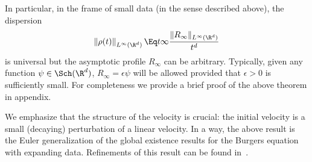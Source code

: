 In particular, in the frame of small data (in the sense described above), the dispersion
\begin{equation*}
\left\| \rho(t)\right\|_{L^\infty(\R^d)}\Eq t \infty \frac{\|R_\infty\|_{L^\infty(\R^d)}}{t^d}
\end{equation*}
is universal but the asymptotic profile $R_\infty$ can be arbitrary. Typically, given any function $\psi\in \Sch(\R^d)$, $R_\infty= \epsilon \psi$ will be allowed provided that $\epsilon>0$ is sufficiently small. For completeness we provide a brief proof of the above theorem in appendix.

We emphasize that the structure of the velocity is crucial: the initial velocity is a small (decaying) perturbation of a linear velocity. In a way, the above result is the Euler generalization of the global existence results for the Burgers equation with expanding data. Refinements of this result can be found in~\cite{GrSe97,Gra98,Serre2017}.

